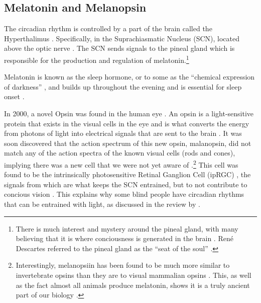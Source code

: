 \subsection{Melatonin and Melanopsin}

The circadian rhythm is controlled by a part of the brain called the Hyperthalimus \citep{stephanCircadianRhythmsDrinking1972}. Specifically, in the Suprachiasmatic Nucleus (SCN), located above the optic nerve \citep{welshIndividualNeuronsDissociated1995}. The SCN sends signals to the pineal gland \citep{cassoneMelatoninRoleVertebrate1998, borjiginPINEALGLANDMELATONIN1999} which is responsible for the production and regulation of melatonin.\footnote{
There is much interest and mystery around the pineal gland, with many believing that it is where conciousness is generated in the brain \citep{bobMelatoninConsciousnessTraumatic2008}. Ren\'e Descartes referred to the pineal gland as the ``seat of the soul'' \citep{lokhorstDescartesPinealGland2020}.
}

Melatonin is known as the sleep hormone, or to some as the ``chemical expression of darkness'' \citep{reiterMelatoninChemicalExpression1991}, and builds up throughout the evening and is essential for sleep onset \citep{arendtImportanceRelevanceMelatonin2003}.

In 2000, a novel Opsin was found in the human eye \citep{provencioNovelHumanOpsin2000}. An opsin is a light-sensitive protein that exists in the visual cells in the eye and is what converts the energy from photons of light into electrical signals that are sent to the brain \citep{terakitaOpsins2005}. It was soon discovered that the action spectrum of this new opsin, malanopsin, did not match any of the action spectra of the known visual cells (rods and cones), implying there was a new cell that we were not yet aware of \citep{thapanActionSpectrumMelatonin2001}.\footnote{
Interestingly, melanopsiin has been found to be much more similar to invertebrate opsins than they are to visual mammalian opsins \citep{provencioMelanopsinOpsinMelanophores1998}. This, as well as the fact almost all animals produce melatonin, shows it is a truly ancient part of our biology \citep{daviesEvolutionFunctionMelanopsin2014}.
} 
This cell was found to be the intrinsically photosensitive Retinal Ganglion Cell (ipRGC) \citep{bersonPhototransductionRetinalGanglion2002}, the signals from which are what keeps the SCN entrained, but to not contribute to concious vision \citep{bersonPhototransductionGanglioncellPhotoreceptors2007}. This explains why some blind people have circadian rhythms that can be entrained with light, as discussed in the review by \citet{allenCircadianRhythmsBlind2019}.










